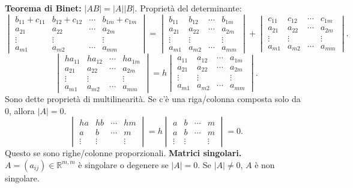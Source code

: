 \documentclass[11pt,a4paper]{article}
\newcommand{\pagina}[1]{\clearpage}
\begin{document}
\textbf{Teorema di Binet:} $|AB|=|A||B|$.
Proprietà del determinante:
\[\begin{vmatrix}b_{11}+c_{11}&b_{12}+c_{12}&\cdots&b_{1m}+c_{1m}\\a_{21}&a_{22}&\cdots&a_{2m}\\\vdots&\vdots&&\vdots\\a_{m1}&a_{m2}&\cdots&a_{mm}\end{vmatrix}
=\begin{vmatrix}b_{11}&b_{12}&\cdots&b_{1m}\\a_{21}&a_{22}&\cdots&a_{2m}\\\vdots&\vdots&&\vdots\\a_{m1}&a_{m2}&\cdots&a_{mm}\end{vmatrix}
+\begin{vmatrix}c_{11}&c_{12}&\cdots&c_{1m}\\a_{21}&a_{22}&\cdots&a_{2m}\\\vdots&\vdots&&\vdots\\a_{m1}&a_{m2}&\cdots&a_{mm}\end{vmatrix}.\]
\[\begin{vmatrix}ha_{11}&ha_{12}&\cdots&ha_{1m}\\a_{21}&a_{22}&\cdots&a_{2m}\\\vdots&\vdots&&\vdots\\a_{m1}&a_{m2}&\cdots&a_{mm}\end{vmatrix}
=h\begin{vmatrix}a_{11}&a_{12}&\cdots&a_{1m}\\a_{21}&a_{22}&\cdots&a_{2m}\\\vdots&\vdots&&\vdots\\a_{m1}&a_{m2}&\cdots&a_{mm}\end{vmatrix}.\]
Sono dette proprietà di multilinearità. Se c'è una riga/colonna composta solo da $0$, allora $|A|=0$.
\[\begin{vmatrix}ha&hb&\cdots&hm\\a&b&\cdots&m\\\vdots&\vdots&&\vdots\end{vmatrix}
=h\begin{vmatrix}a&b&\cdots&m\\a&b&\cdots&m\\\vdots&\vdots&&\vdots\end{vmatrix}=0.\]
Questo se sono righe/colonne proporzionali.
\pagina{14}
\textbf{Matrici singolari.} $A=(a_{ij})\in\mathbb R^{m,m}$ è singolare o degenere se $|A|=0$. Se $|A|\ne0$, $A$ è non singolare.
\end{document}
